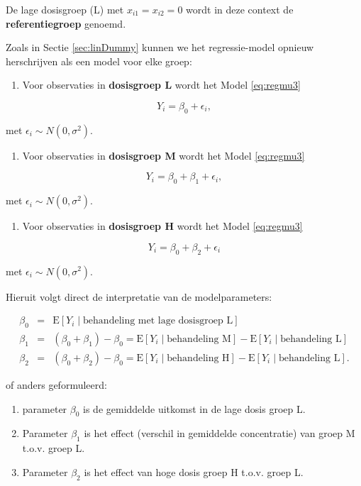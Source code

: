 \documentclass[
  12pt,dutch,coursenotes]{book}
\providecommand{\tightlist}{%
  \setlength{\itemsep}{0pt}\setlength{\parskip}{0pt}}
\theoremstyle{definition}
\theoremstyle{definition}
\theoremstyle{definition}
\theoremstyle{definition}
\theoremstyle{remark}
\begin{document}
De lage dosisgroep (L) met \(x_{i1}=x_{i2}=0\) wordt in deze context de \textbf{referentiegroep} genoemd.

Zoals in Sectie \ref{sec:linDummy} kunnen we het regressie-model opnieuw herschrijven als een model voor elke groep:

\begin{enumerate}
\def\labelenumi{\arabic{enumi}.}
\tightlist
\item
  Voor observaties in \textbf{dosisgroep L} wordt het Model \eqref{eq:regmu3}
\end{enumerate}

\[Y_i = \beta_0+\epsilon_i,\]

met \(\epsilon_i \sim N(0,\sigma^2)\).

\begin{enumerate}
\def\labelenumi{\arabic{enumi}.}
\setcounter{enumi}{1}
\tightlist
\item
  Voor observaties in \textbf{dosisgroep M} wordt het Model \eqref{eq:regmu3}
\end{enumerate}

\[Y_i = \beta_0+\beta_1 + \epsilon_i,\]

met \(\epsilon_i \sim N(0,\sigma^2)\).

\begin{enumerate}
\def\labelenumi{\arabic{enumi}.}
\setcounter{enumi}{2}
\tightlist
\item
  Voor observaties in \textbf{dosisgroep H} wordt het Model \eqref{eq:regmu3}
\end{enumerate}

\[Y_i = \beta_0+\beta_2 + \epsilon_i\]

met \(\epsilon_i \sim N(0,\sigma^2)\).

Hieruit volgt direct de interpretatie van de modelparameters:

\begin{eqnarray*}
   \beta_0 &=&  \text{E}\left[Y_i \mid \text{behandeling met lage dosisgroep L}\right] \\
   \beta_1 &=&  (\beta_0+\beta_1)-\beta_0 = \text{E}\left[Y_i \mid \text{behandeling M}\right] - \text{E}\left[Y_i \mid \text{behandeling L}\right] \\
   \beta_2 &=&  (\beta_0+\beta_2)-\beta_0 = \text{E}\left[Y_i \mid \text{behandeling H}\right]-\text{E}\left[Y_i \mid \text{behandeling L}\right].
\end{eqnarray*}

of anders geformuleerd:

\begin{enumerate}
\def\labelenumi{\arabic{enumi}.}
\tightlist
\item
  parameter \(\beta_0\) is de gemiddelde uitkomst in de lage dosis groep L.
\item
  Parameter \(\beta_1\) is het effect (verschil in gemiddelde concentratie) van groep M t.o.v. groep L.
\item
  Parameter \(\beta_2\) is het effect van hoge dosis groep H t.o.v. groep L.
\end{enumerate}
\end{document}
